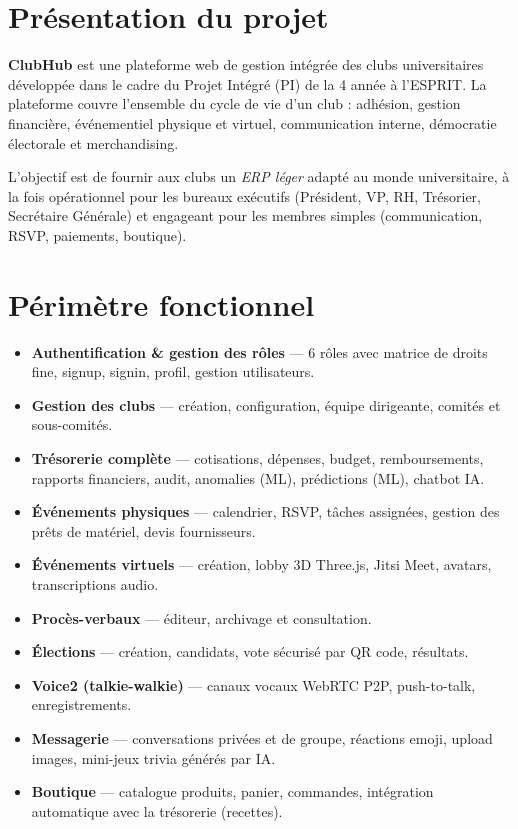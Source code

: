 \documentclass[11pt,a4paper]{report}
\begin{document}
\section{Présentation du projet}

\textbf{ClubHub} est une plateforme web de gestion intégrée des clubs universitaires
développée dans le cadre du Projet Intégré (PI) de la 4 année à l'ESPRIT.
La plateforme couvre l'ensemble du cycle de vie d'un club : adhésion, gestion
financière, événementiel physique et virtuel, communication interne, démocratie
électorale et merchandising.

L'objectif est de fournir aux clubs un \textit{ERP léger} adapté au monde
universitaire, à la fois opérationnel pour les bureaux exécutifs (Président, VP,
RH, Trésorier, Secrétaire Générale) et engageant pour les membres simples
(communication, RSVP, paiements, boutique).

\section{Périmètre fonctionnel}

\begin{itemize}[leftmargin=*]
  \item \textbf{Authentification \& gestion des rôles} — 6 rôles avec matrice de droits
        fine, signup, signin, profil, gestion utilisateurs.
  \item \textbf{Gestion des clubs} — création, configuration, équipe dirigeante,
        comités et sous-comités.
  \item \textbf{Trésorerie complète} — cotisations, dépenses, budget, remboursements,
        rapports financiers, audit, anomalies (ML), prédictions (ML), chatbot IA.
  \item \textbf{Événements physiques} — calendrier, RSVP, tâches assignées,
        gestion des prêts de matériel, devis fournisseurs.
  \item \textbf{Événements virtuels} — création, lobby 3D Three.js, Jitsi Meet,
        avatars, transcriptions audio.
  \item \textbf{Procès-verbaux} — éditeur, archivage et consultation.
  \item \textbf{Élections} — création, candidats, vote sécurisé par QR code, résultats.
  \item \textbf{Voice2 (talkie-walkie)} — canaux vocaux WebRTC P2P, push-to-talk,
        enregistrements.
  \item \textbf{Messagerie} — conversations privées et de groupe, réactions emoji,
        upload images, mini-jeux trivia générés par IA.
  \item \textbf{Boutique} — catalogue produits, panier, commandes, intégration
        automatique avec la trésorerie (recettes).
\end{itemize}
\end{document}

